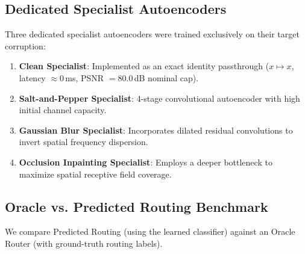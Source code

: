 \documentclass[conference]{IEEEtran}
\begin{document}
\subsection{Dedicated Specialist Autoencoders}
Three dedicated specialist autoencoders were trained exclusively on their target corruption:
\begin{enumerate}
    \item \textbf{Clean Specialist}: Implemented as an exact identity passthrough ($x \mapsto x$, latency $\approx 0$\,ms, PSNR $= 80.0$\,dB nominal cap).
    \item \textbf{Salt-and-Pepper Specialist}: 4-stage convolutional autoencoder with high initial channel capacity.
    \item \textbf{Gaussian Blur Specialist}: Incorporates dilated residual convolutions to invert spatial frequency dispersion.
    \item \textbf{Occlusion Inpainting Specialist}: Employs a deeper bottleneck to maximize spatial receptive field coverage.
\end{enumerate}

\subsection{Oracle vs. Predicted Routing Benchmark}
We compare Predicted Routing (using the learned classifier) against an Oracle Router (with ground-truth routing labels).

\begin{table}[ht]
\caption{System Comparison: Universal AE vs. Hard Router (Oracle vs. Predicted) on Held-Out Test Set}
\label{tab:task2_comparison}
\centering
{}
\end{table}
\end{document}
